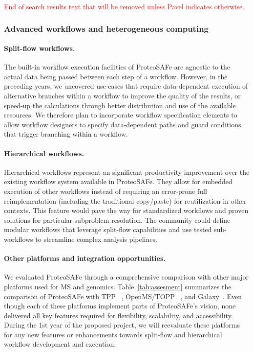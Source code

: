 \documentclass[arial,11pt]{article}
\newcommand{\SF}[1]{\textsf{#1}}
\newcommand{\SYSTEM}[0]{\SF{ProteoSAFe}\xspace}
\newcommand{\NeedRevision}[1]{\textcolor{red}{#1}}
\begin{document}
\NeedRevision{End of search results text that will be removed unless Pavel indicates otherwise.}

\subsubsection{Advanced workflows and heterogeneous computing}
\paragraph{Split-flow workflows.} The built-in workflow execution facilities of \SYSTEM are agnostic to the actual data being passed between each step of a workflow. However, in the preceding years, we uncovered use-cases that require data-dependent execution of alternative branches within a workflow to improve the quality of the results, or speed-up the calculations through better distribution and use of the available resources. We therefore plan to incorporate workflow specification elements to allow workflow designers to specify  data-dependent paths and guard conditions that trigger branching within a workflow.

\paragraph{Hierarchical workflows.} Hierarchical workflows represent an significant productivity improvement over the existing workflow system available in \SYSTEM. They allow for embedded execution of other workflows instead of requiring an error-prone full reimplementation (including the traditional copy/paste) for reutilization in other contexts. This feature would pave the way for standardized workflows and proven solutions for particular subproblem resolution. The community could define modular workflows that leverage split-flow capabilities and use tested sub-workflows to streamline complex analysis pipelines.

\paragraph{Other platforms and integration opportunities.}
We evaluated \SYSTEM through a comprehensive comparison with other major platforms used for MS and genomics. Table~\ref{tab:assesment} summarizes the comparison of \SYSTEM with TPP~\cite{Deutsch:2010} , OpenMS/TOPP~\cite{Reinert:2010} , and Galaxy~\cite{Goecks:2010}. Even though each of these platforms implement parts of \SYSTEM's vision, none delivered all key features required for flexibility, scalability, and accessibility. During the 1st year of the proposed project, we will reevaluate these platforms for any new features or enhancements towards split-flow and hierarchical workflow development and execution.
\end{document}
